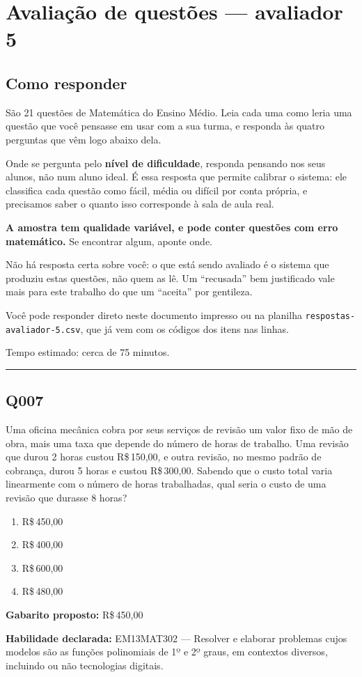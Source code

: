 \documentclass[11pt,a4paper]{article}
\begin{document}
\section*{Avaliação de questões --- avaliador 5}
\subsection*{Como responder}

São 21 questões de Matemática do Ensino Médio. Leia cada uma como leria uma
questão que você pensasse em usar com a sua turma, e responda às quatro
perguntas que vêm logo abaixo dela.

Onde se pergunta pelo \textbf{nível de dificuldade}, responda pensando nos
seus alunos, não num aluno ideal. É essa resposta que permite calibrar o
sistema: ele classifica cada questão como fácil, média ou difícil por conta
própria, e precisamos saber o quanto isso corresponde à sala de aula real.

\textbf{A amostra tem qualidade variável, e pode conter questões com erro
matemático.} Se encontrar algum, aponte onde.

Não há resposta certa sobre você: o que está sendo avaliado é o sistema que
produziu estas questões, não quem as lê. Um ``recusada'' bem justificado vale
mais para este trabalho do que um ``aceita'' por gentileza.

Você pode responder direto neste documento impresso ou na planilha
\texttt{respostas-avaliador-5.csv}, que já vem com os códigos dos itens nas linhas.

Tempo estimado: cerca de 75 minutos.
\bigskip\hrule\bigskip
\begin{samepage}
\subsection*{Q007}
Uma oficina mecânica cobra por seus serviços de revisão um valor fixo de mão de obra, mais uma taxa que depende do número de horas de trabalho. Uma revisão que durou 2 horas custou R\$\,150,00, e outra revisão, no mesmo padrão de cobrança, durou 5 horas e custou R\$\,300,00. Sabendo que o custo total varia linearmente com o número de horas trabalhadas, qual seria o custo de uma revisão que durasse 8 horas?
\begin{enumerate}[label=(\alph*),nosep,leftmargin=*]
\item R\$\,450,00
\item R\$\,400,00
\item R\$\,600,00
\item R\$\,480,00
\end{enumerate}

\textbf{Gabarito proposto:} R\$\,450,00

\textbf{Habilidade declarada:} EM13MAT302 --- Resolver e elaborar problemas cujos modelos são as funções polinomiais de 1º e 2º graus, em contextos diversos, incluindo ou não tecnologias digitais.
\end{samepage}
\end{document}
